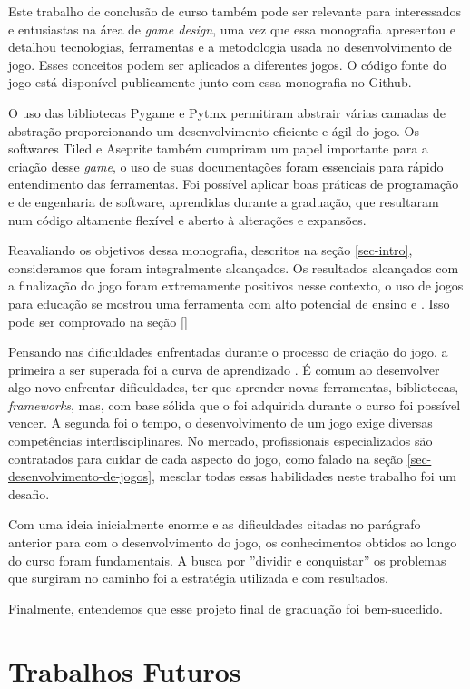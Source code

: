 Este trabalho de conclusão de curso também pode ser relevante para interessados e entusiastas na área de \textit{game design}, uma vez que essa monografia apresentou e detalhou tecnologias, ferramentas e a metodologia usada no desenvolvimento de jogo. Esses conceitos podem ser aplicados a diferentes jogos. O código fonte do jogo está disponível publicamente junto com essa monografia no Github.

O uso das bibliotecas Pygame e Pytmx permitiram abstrair várias camadas de abstração proporcionando um desenvolvimento eficiente e ágil do jogo. Os softwares Tiled e Aseprite também cumpriram um papel importante para a criação desse \textit{game}, o uso de suas documentações foram essenciais para rápido entendimento das ferramentas. Foi possível aplicar boas práticas de programação e de engenharia de software, aprendidas durante a graduação, que resultaram num código altamente flexível e aberto à alterações e expansões.

Reavaliando os objetivos dessa monografia, descritos na seção \ref{sec-intro}, consideramos que foram integralmente alcançados. Os resultados alcançados com a finalização do jogo foram extremamente positivos nesse contexto, o uso de jogos para educação se mostrou uma ferramenta com alto potencial de ensino e . Isso pode ser comprovado na seção \ref{}

Pensando nas dificuldades enfrentadas durante o processo de criação do jogo, a primeira a ser superada foi a curva de aprendizado . É comum ao desenvolver algo novo enfrentar dificuldades, ter que aprender novas ferramentas, bibliotecas, \textit{frameworks}, mas, com base sólida que o foi adquirida durante o curso foi possível vencer. A segunda foi o tempo, o desenvolvimento de um jogo exige diversas competências interdisciplinares. No mercado, profissionais especializados são contratados para cuidar de cada aspecto do jogo, como falado na seção \ref{sec-desenvolvimento-de-jogos}, mesclar todas essas habilidades neste trabalho foi um desafio.

Com uma ideia inicialmente enorme e as dificuldades citadas no parágrafo anterior para com o desenvolvimento do jogo, os conhecimentos obtidos ao longo do curso foram fundamentais. A busca por ''dividir e conquistar'' os problemas que surgiram no caminho foi a estratégia utilizada e com resultados.

Finalmente, entendemos que esse projeto final de graduação foi bem-sucedido.

\section{Trabalhos Futuros}
\label{sec-conclusoes-trabalhosfuturos}

